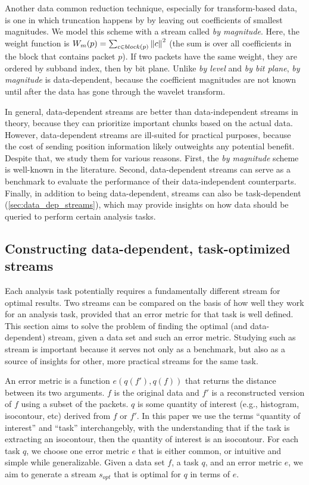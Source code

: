 Another data common reduction technique, especially for transform-based data, is one in which
truncation happens by by leaving out coefficients of smallest magnitudes. We model this scheme with
a stream called \emph{by magnitude}. Here, the weight function is $W_m(p)=\sum_{c\in
block(p)}\left\lVert c\right\rVert^2$ (the sum is over all coefficients in the block that contains packet $p$). If
two packets have the same weight, they are ordered by subband index, then by bit plane. Unlike
\emph{by level} and \emph{by bit plane}, \emph{by magnitude} is data-dependent, because the
coefficient magnitudes are not known until after the data has gone through the wavelet transform.

In general, data-dependent streams are better than data-independent streams in theory, because they
can prioritize important chunks based on the actual data. However, data-dependent streams are
ill-suited for practical purposes, because the cost of sending position information likely
outweights any potential benefit. Despite that, we study them for various reasons. First, the
\emph{by magnitude} scheme is well-known in the literature. Second, data-dependent streams can serve
as a benchmark to evaluate the performance of their data-independent counterparts. Finally, in
addition to being data-dependent, streams can also be task-dependent
(\autoref{sec:data_dep_streams}), which may provide insights on how data should be queried to
perform certain analysis tasks.

\subsection{Constructing data-dependent, task-optimized streams}\label{sec:data_dep_streams}
Each analysis task potentially requires a fundamentally different stream for optimal results. Two
streams can be compared on the basis of how well they work for an analysis task, provided that an
error metric for that task is well defined. This section aims to solve the problem of finding the
optimal (and data-dependent) stream, given a data set and such an error metric. Studying such as
stream is important because it serves not only as a benchmark, but also as a source of insights for
other, more practical streams for the same task.

An error metric is a function $e(q(f'),q(f))$ that returns the distance between its two arguments.
$f$ is the original data and $f'$ is a reconstructed version of $f$ using a subset of the packets.
$q$ is some quantity of interest (e.g., histogram, isocontour, etc) derived from $f$ or $f'$. In
this paper we use the terms ``quantity of interest'' and ``task'' interchangebly, with the
understanding that if the task is extracting an isocontour, then the quantity of interest is an
isocontour. For each task $q$, we choose one error metric $e$ that is either common, or intuitive
and simple while generalizable. Given a data set $f$, a task $q$, and an error metric $e$, we aim to
generate a stream $s_{opt}$ that is optimal for $q$ in terms of $e$.

